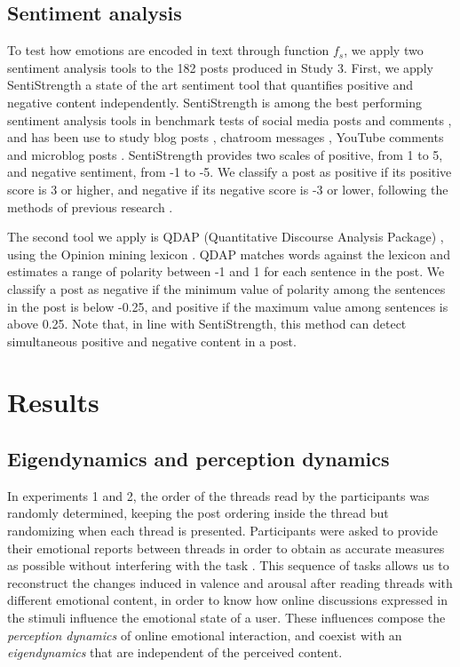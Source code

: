 \documentclass[nologo,url,11pt,a4paper]{ETHpaper}
\begin{document}
\subsection{Sentiment analysis}

To test how emotions are encoded in text through function $f_s$, we apply two
sentiment analysis tools to  the 182 posts produced in Study 3. First, we
apply SentiStrength \cite{Thelwall2010} a state of the art sentiment tool that
quantifies positive and negative content independently. SentiStrength is among
the best performing sentiment analysis tools in benchmark tests of social
media posts and comments \cite{Goncalves2013}, and has been use to study blog
posts \cite{Chmiel2011}, chatroom messages \cite{Garas2012}, YouTube comments
\cite{Garcia2012} and microblog posts \cite{Thelwall2011}. SentiStrength
provides two scales of positive, from 1 to 5, and negative sentiment, from -1
to -5. We classify a post as positive if its positive score is 3 or higher,
and negative if its negative score is -3 or lower, following the methods of
previous research \cite{Thelwall2010,Thelwall2011,Garcia2012}.

The second tool we apply is QDAP (Quantitative Discourse Analysis Package)
\cite{Rinker2013}, using the Opinion mining lexicon \cite{Hu2004}. QDAP
matches words against the lexicon and estimates a range of polarity between -1
and 1 for each sentence in the post.  We classify a post as negative if the
minimum value of polarity among the sentences in the post is below -0.25, and
positive if the maximum value among sentences is above 0.25. Note that, in
line with SentiStrength, this method can detect simultaneous positive and
negative content in a post.



\section{Results}

\subsection{Eigendynamics and perception dynamics}
\label{sec:perception}

In experiments 1 and  2, the order of the threads read by the participants was randomly determined, keeping the post ordering inside the thread but randomizing when each thread is presented.  
Participants were asked to provide their emotional reports between threads in order to obtain as accurate measures as possible without interfering with the task \cite{Robinson2002}.
This sequence of tasks allows us to reconstruct the changes induced in valence and arousal after reading threads with different emotional content, in order to know how online discussions expressed in the stimuli influence the emotional state of a user. 
These influences compose the \emph{perception dynamics} of online emotional interaction, and coexist with an \emph{eigendynamics} that are independent of the perceived content.
\end{document}
